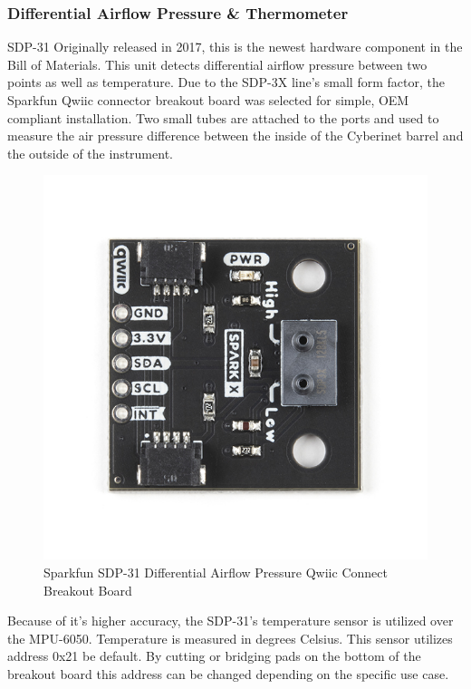 \subsubsection{Differential Airflow Pressure \& Thermometer}

SDP-31
Originally released in 2017, this is the newest hardware component in the Bill of Materials. This unit detects differential airflow pressure between two points as well as temperature. Due to the SDP-3X line’s small form factor, the Sparkfun Qwiic connector breakout board was selected for simple, OEM compliant installation. Two small tubes are attached to the ports and used to measure the air pressure difference between the inside of the Cyberinet barrel and the outside of the instrument.

\begin{center}
    \begin{figure}
        \centering
        \includegraphics[scale=1.5, angle=90]{diagrams/oem/spd31.jpg}
        \caption{Sparkfun SDP-31 Differential Airflow Pressure Qwiic Connect Breakout Board}
        \label{fig:sdp-31}
    \end{figure}
\end{center}

Because of it’s higher accuracy, the SDP-31’s temperature sensor is utilized over the MPU-6050. Temperature is measured in degrees Celsius. This sensor utilizes address 0x21 be default. By cutting or bridging pads on the bottom of the breakout board this address can be changed depending on the specific use case.




